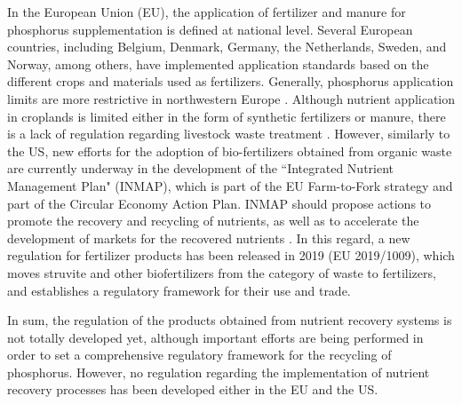 \begin{refsection}[referencesCh5]
In the European Union (EU), the application of fertilizer and manure for
phosphorus supplementation
is defined at national level. Several European countries, including Belgium, Denmark, Germany, the Netherlands, Sweden, and Norway, among others, have implemented application standards based on the different crops and materials used as fertilizers. Generally, phosphorus application limits are more restrictive in northwestern Europe \citep{amery2014agricultural}. 
Although nutrient application in croplands is limited either in the form of synthetic fertilizers or manure, there is a lack of regulation regarding livestock waste treatment \citep{Piot_Lepetit2012}.
However, similarly to the US, new efforts for the adoption of bio-fertilizers obtained from organic waste are currently underway in the development of the ``Integrated Nutrient Management Plan" (INMAP), which is part of the EU Farm-to-Fork strategy and part of the Circular Economy Action Plan. INMAP should propose actions to promote the recovery and recycling of nutrients, as well as to accelerate the development of markets for the recovered nutrients \citep{ESSP2021, CircularEconomyActionPlan}. In this regard, a new regulation for fertilizer products has been released in 2019 (EU 2019/1009), which moves struvite and other biofertilizers from the category of waste to fertilizers, and establishes a regulatory framework for their use and trade.

In sum, the regulation of the products obtained from nutrient recovery systems is not totally developed yet, although important efforts are being performed in order to set a comprehensive regulatory framework for the recycling of phosphorus. However, no regulation regarding the implementation of nutrient recovery processes has been developed either in the EU and the US.


\end{refsection}
